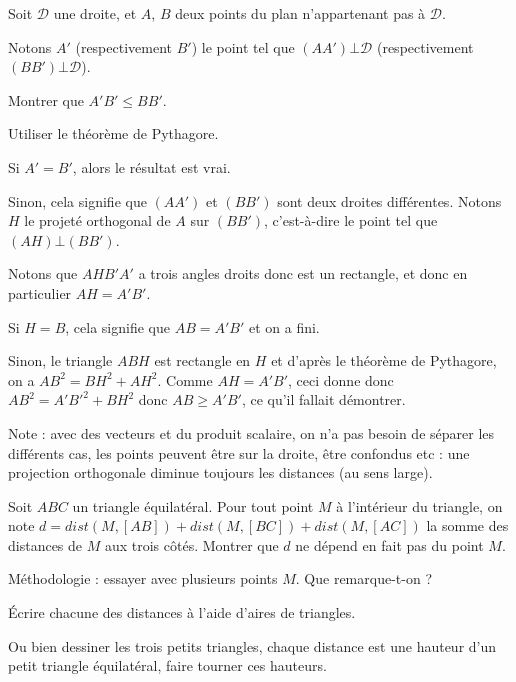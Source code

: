 \begin{exo}
Soit $\mathcal D$ une droite, et $A$, $B$ deux points du plan n'appartenant pas à $\mathcal D$.

Notons $A'$ (respectivement $B'$) le point tel que $(AA')\bot \mathcal D$ (respectivement $(BB')\bot \mathcal D$).

Montrer que $A'B' \leq BB'$.
\begin{hint}
Utiliser le théorème de Pythagore.
\end{hint}
\begin{sol}
Si $A'=B'$, alors le résultat est vrai.

Sinon, cela signifie que $(AA')$ et $(BB')$ sont deux droites différentes. Notons $H$ le projeté orthogonal de $A$ sur $(BB')$, c'est-à-dire le point tel que $(AH)\bot (BB')$.

Notons que $AHB'A'$ a trois angles droits donc est un rectangle, et donc en particulier $AH=A'B'$.

Si $H=B$, cela signifie que $AB=A'B'$ et on a fini.

Sinon, le triangle $ABH$ est rectangle en $H$ et d'après le théorème de Pythagore, on a $AB^2=BH^2+AH^2$. Comme $AH=A'B'$, ceci donne donc $AB^2=A'B'^2+BH^2$ donc $AB\geq A'B'$, ce qu'il fallait démontrer.

Note : avec des vecteurs et du produit scalaire, on n'a pas besoin de séparer les différents cas, les points peuvent être sur la droite, être confondus etc : une projection orthogonale diminue toujours les distances (au sens large).
\end{sol}
\end{exo}


\begin{exo}
\label{sommeDistances} %
Soit $ABC$ un triangle équilatéral. Pour tout point $M$ à l'intérieur du triangle, on note $d = dist(M,[AB]) + dist(M,[BC]) + dist(M,[AC])$ la somme des distances de $M$ aux trois côtés. Montrer que $d$ ne dépend en fait pas du point $M$. 
\begin{hint} Méthodologie : essayer avec plusieurs points $M$. Que remarque-t-on ?
 

\end{hint}

\begin{sol}
\'Ecrire chacune des distances à l'aide d'aires de triangles. 

Ou bien dessiner les trois petits triangles, chaque distance est une hauteur d'un petit triangle équilatéral, faire tourner ces hauteurs.
\end{sol}
\end{exo} 




